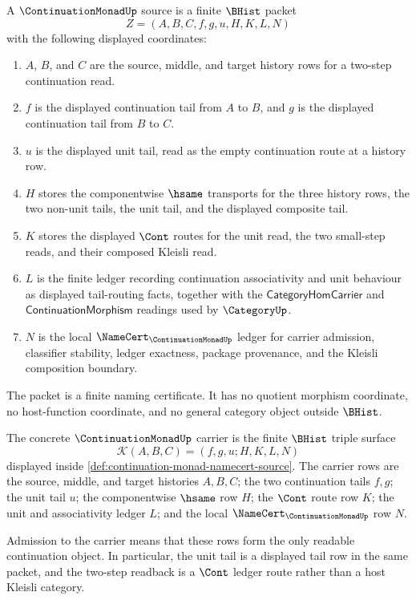\begin{definition}
\label{def:continuation-monad-namecert-source}
A $\ContinuationMonadUp$ source is a finite $\BHist$ packet
$$
Z=(A,B,C,f,g,u,H,K,L,N)
$$
with the following displayed coordinates:
\begin{enumerate}
\item $A$, $B$, and $C$ are the source, middle, and target history rows for a two-step continuation read.
\item $f$ is the displayed continuation tail from $A$ to $B$, and $g$ is the displayed continuation tail from $B$ to $C$.
\item $u$ is the displayed unit tail, read as the empty continuation route at a history row.
\item $H$ stores the componentwise $\hsame$ transports for the three history rows, the two non-unit tails, the unit tail, and the displayed composite tail.
\item $K$ stores the displayed $\Cont$ routes for the unit read, the two small-step reads, and their composed Kleisli read.
\item $L$ is the finite ledger recording continuation associativity and unit behaviour as displayed tail-routing facts, together with the $\mathsf{CategoryHomCarrier}$ and $\mathsf{ContinuationMorphism}$ readings used by $\CategoryUp$.
\item $N$ is the local $\NameCert_{\ContinuationMonadUp}$ ledger for carrier admission, classifier stability, ledger exactness, package provenance, and the Kleisli composition boundary.
\end{enumerate}
The packet is a finite naming certificate. It has no quotient morphism coordinate, no host-function coordinate, and no general category object outside $\BHist$.
\end{definition}

\begin{definition}
\label{def:continuation-monad-carrier}
The concrete $\ContinuationMonadUp$ carrier is the finite $\BHist$ triple surface
$$
\mathcal{K}(A,B,C)=(f,g,u;H,K,L,N)
$$
displayed inside \autoref{def:continuation-monad-namecert-source}. The carrier rows are the source, middle, and target histories $A,B,C$; the two continuation tails $f,g$; the unit tail $u$; the componentwise $\hsame$ row $H$; the $\Cont$ route row $K$; the unit and associativity ledger $L$; and the local $\NameCert_{\ContinuationMonadUp}$ row $N$.

Admission to the carrier means that these rows form the only readable continuation object. In particular, the unit tail is a displayed tail row in the same packet, and the two-step readback is a $\Cont$ ledger route rather than a host Kleisli category.
\end{definition}

